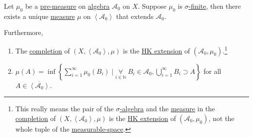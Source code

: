 \begin{corollary}\label{col:lec-6}
	Let \(\mu _0\) be a \hyperref[def:pre-measure]{pre-measure} on \hyperref[def:algebra]{algebra} \(\mathcal{A} _0\) on \(X\). Suppose \(\mu _0\) is
	\hyperref[def:finite-measure]{\(\sigma \)-finite}, then there exists a unique \hyperref[def:measure]{measure} \(\mu\) on \(\left< \mathcal{A} _0 \right> \)
	that extends \(\mathcal{A} _0\).

	Furthermore,
	\begin{enumerate}[(1)]
		\item The \hyperref[def:complete-measure-space]{completion} of \((X, \left< \mathcal{A} _0 \right>, \mu  )\) is the \hyperref[def:HK-extension]{HK extension} of
		      \((\mathcal{A} _0, \mu _0)\).\footnote{This really means the pair of the \hyperref[def:sigma-algebra]{\(\sigma\)-algebra} and the \hyperref[def:measure]{measure} in
			      the \hyperref[def:complete]{completion} of \((X, \left< \mathcal{A} _0 \right>, \mu  )\) is the \hyperref[def:HK-extension]{HK extension} of \((\mathcal{A} _0, \mu _0)\),
			      not the whole tuple of the \hyperref[def:measurable-space]{measurable-space}.}
		\item \(\mu (A) = \inf\left\{\sum\limits_{i=1}^{\infty} \mu _0(B_{i})\mid \underset{i\in\mathbb{N} }{\forall}\ B_{i}\in \mathcal{A} _0, \bigcup\limits_{i=1}^{\infty} B_{i}\supset A\right\}\)
		      for all \(A\in \overline{\left< \mathcal{A} _0 \right> }\).
	\end{enumerate}
\end{corollary}